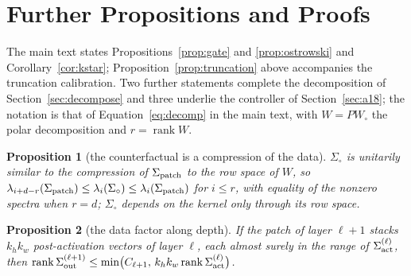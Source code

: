 \documentclass[10pt,journal,compsoc]{IEEEtran}
\newtheorem{proposition}{Proposition}
\begin{document}
\begin{table}[t]
  \centering
  \caption{Effect sizes behind ``the two populations merge'' (Section~\ref{sec:rmax}): per-model
  Hodges--Lehmann shift of the bounded layers against the unbounded ones in $k^*(0.999)$, under $C$
  ($\Delta_C$) and under $r_{\max}$ ($\Delta_{r_{\max}}$, 95\% layer-bootstrap CI), the probability of
  superiority $A = P(\text{bounded} > \text{unbounded})$, the smallest equivalence margin $\delta_{\min}$
  (largest 90\% CI bound in magnitude), the profile's own adjacent-layer jitter, and equivalence at the
  jitter / $0.05$ / $0.10$ margins (\checkmark\ = the 90\% CI lies inside the margin). $n_b/n_u$: bounded and
  unbounded dense layers passing the gate; depthwise layers count with the unbounded group, as in
  Section~\ref{sec:rmax}. Generated by \texttt{equivalence\_rmax.py}.}
  \label{tab:sequivalence}
  \footnotesize\setlength{\tabcolsep}{4pt}
  
\end{table}

\clearpage
\section{Further Propositions and Proofs}
\label{supp:proofs}

The main text states Propositions~\ref{prop:gate} and \ref{prop:ostrowski} and Corollary~\ref{cor:kstar}; Proposition~\ref{prop:truncation} above accompanies the truncation calibration. Two further statements complete the decomposition of Section~\ref{sec:decompose} and three underlie the controller of Section~\ref{sec:a18}; the notation is that of Equation~\eqref{eq:decomp} in the main text, with $W = PW_{\circ}$ the polar decomposition and $r = \operatorname{rank} W$.

\begin{proposition}[the counterfactual is a compression of the data]
\label{prop:compression}
$\Sigma_{\circ}$ is unitarily similar to the compression of $\Sigma_{\rm patch}$
to the row space of $W$, so $\lambda_{i + d - r}(\Sigma_{\rm patch}) \le
\lambda_i(\Sigma_{\circ}) \le \lambda_i(\Sigma_{\rm patch})$ for $i \le r$, with
equality of the nonzero spectra when $r = d$; $\Sigma_{\circ}$ depends on
the kernel only through its row space.
\end{proposition}

\begin{proposition}[the data factor along depth]
\label{prop:depth}
If the patch of layer $\ell + 1$ stacks $k_h k_w$ post-activation vectors
of layer $\ell$, each almost surely in the range of
$\Sigma_{\rm act}^{(\ell)}$, then
$\operatorname{rank} \Sigma_{\rm out}^{(\ell+1)} \le \min\bigl(C_{\ell+1},\,
k_h k_w \operatorname{rank} \Sigma_{\rm act}^{(\ell)}\bigr)$.
\end{proposition}
\end{document}
